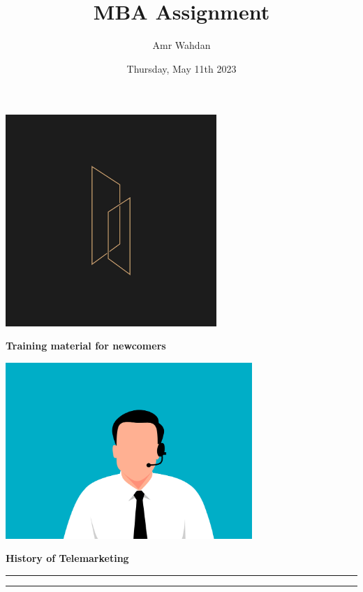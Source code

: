 \documentclass[12pt]{article}
\title{MBA Assignment}
\author{Amr Wahdan}
\date{Thursday, May 11th 2023}
\renewcommand{\maketitle}{
\begin{center}
    \Huge\textbf{Training material for newcomers} \\ 

    \vspace{1em}
\end{center}
}
\begin{document}

\begin{center}
    \includegraphics[width=0.6\textwidth]{tt_coldcalling.jpg}  
\end{center}
\vspace{1em}
\begin{center}
\end{center}
\vspace{1em}
\maketitle
{}
\newpage

\begin{center}
    \includegraphics[width=0.7\textwidth]{headset.png}  
\end{center}
\vspace{1em}

\begin{center}
    \Large\bfseries History of Telemarketing
    \vspace{0.5em}
    \hrule\vspace{0.2em}\hrule
\end{center}
\end{document}
